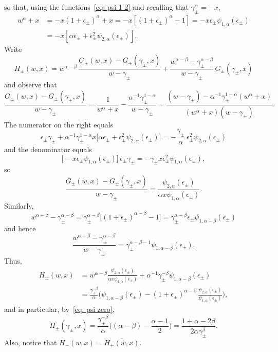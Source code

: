 \documentclass[12pt,a4paper]{article}
\begin{document}
so that, using the functions~\eqref{eq: psi 1 2} and recalling that 
$\gamma_\pm^\alpha=-x$,
\begin{align*}
w^\alpha+x&=-x(1+\epsilon_\pm)^\alpha+x=-x[(1+\epsilon_\pm)^\alpha-1]
    =-x\epsilon_\pm\psi_{1,\alpha}(\epsilon_\pm)\\
    &=-x[\alpha\epsilon_\pm+\epsilon_\pm^2\psi_{2,\alpha}(\epsilon_\pm)].
\end{align*}
Write
\[
H_\pm(w,x)=w^{\alpha-\beta}\,\frac{G_\pm(w,x)-G_\pm(\gamma_\pm,x)}{w-\gamma_\pm}
    +\frac{w^{\alpha-\beta}-\gamma_\pm^{\alpha-\beta}}{w-\gamma_\pm}\,
    G_\pm(\gamma_\pm,x)
\]
and observe that
\[
\frac{G_\pm(w,x)-G_\pm(\gamma_\pm,x)}{w-\gamma_\pm}=\frac{1}{w^\alpha+x}
    -\frac{\alpha^{-1}\gamma_\pm^{1-\alpha}}{w-\gamma_\pm}
    =\frac{(w-\gamma_\pm)-\alpha^{-1}\gamma_\pm^{1-\alpha}(w^\alpha+x)}%
{(w^\alpha+x)(w-\gamma_\pm)}.
\]
The numerator on the right equals
\[
\epsilon_\pm\gamma_\pm+\alpha^{-1}\gamma_\pm^{1-\alpha}x
    \bigl[\alpha\epsilon_\pm+\epsilon_\pm^2\psi_{2,\alpha}(\epsilon_\pm)\bigr]
    =-\frac{\gamma_\pm}{\alpha}\,\epsilon_\pm^2\psi_{2,\alpha}(\epsilon_\pm)
\]
and the denominator equals
\[
\bigl[-x\epsilon_\pm\psi_{1,\alpha}(\epsilon_\pm)\bigr]\,\epsilon_\pm\gamma_\pm
    =-\gamma_\pm x\epsilon_\pm^2\psi_{1,\alpha}(\epsilon_\pm),
\]
so
\[
\frac{G_\pm(w,x)-G_\pm(\gamma_\pm,x)}{w-\gamma_\pm}
=\frac{\psi_{2,\alpha}(\epsilon_\pm)}{\alpha x\psi_{1,\alpha}(\epsilon_\pm)}.
\]
Similarly,
\[
w^{\alpha-\beta}-\gamma_\pm^{\alpha-\beta}
    =\gamma_\pm^{\alpha-\beta}\bigl[(1+\epsilon_\pm)^{\alpha-\beta}-1]
    =\gamma_\pm^{\alpha-\beta}\epsilon_\pm\psi_{1,\alpha-\beta}(\epsilon_\pm)
\]
and hence
\[
\frac{w^{\alpha-\beta}-\gamma_\pm^{\alpha-\beta}}{w-\gamma_\pm}
    =\gamma_\pm^{\alpha-\beta-1}\psi_{1,\alpha-\beta}(\epsilon_\pm).
\]
Thus,
\begin{align*}
H_\pm(w,x)&=w^{\alpha-\beta}
\frac{\psi_{2,\alpha}(\epsilon_\pm)}{\alpha x\psi_{1,\alpha}(\epsilon_\pm)}
    +\alpha^{-1}\gamma_\pm^{-\beta}\psi_{1,\alpha-\beta}(\epsilon_\pm)\\
&=\frac{\gamma_\pm^{-\beta}}{\alpha}\biggl(\psi_{1,\alpha-\beta}(\epsilon_\pm)
    -(1+\epsilon_\pm)^{\alpha-\beta}\,
    \frac{\psi_{2,\alpha}(\epsilon_\pm)}{\psi_{1,\alpha}(\epsilon_\pm)}\biggr),
\end{align*}
and in particular, by~\eqref{eq: psi zero},
\[
H_\pm(\gamma_\pm,x)=\frac{\gamma_\pm^{-\beta}}{\alpha}\biggl((\alpha-\beta)
    -\frac{\alpha-1}{2}\biggr)=\frac{1+\alpha-2\beta}{2\alpha\gamma_\pm^\beta}.
\]
Also, notice that $H_-(w,x)=\overline{H_+(\bar w,x)}$.
\end{document}
